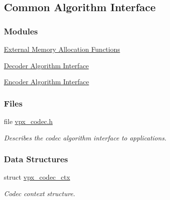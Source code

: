 \hypertarget{group__codec}{\subsection{Common Algorithm Interface}
\label{group__codec}
}
\subsubsection*{Modules}
\begin{DoxyCompactItemize}
\item 
\hyperlink{group__cap__xma}{External Memory Allocation Functions}
\item 
\hyperlink{group__decoder}{Decoder Algorithm Interface}
\item 
\hyperlink{group__encoder}{Encoder Algorithm Interface}
\end{DoxyCompactItemize}
\subsubsection*{Files}
\begin{DoxyCompactItemize}
\item 
file \hyperlink{vpx__codec_8h}{vpx\+\_\+codec.\+h}
\begin{DoxyCompactList}\small\item\em Describes the codec algorithm interface to applications. \end{DoxyCompactList}\end{DoxyCompactItemize}
\subsubsection*{Data Structures}
\begin{DoxyCompactItemize}
\item 
struct \hyperlink{structvpx__codec__ctx}{vpx\+\_\+codec\+\_\+ctx}
\begin{DoxyCompactList}\small\item\em Codec context structure. \end{DoxyCompactList}\end{DoxyCompactItemize}
